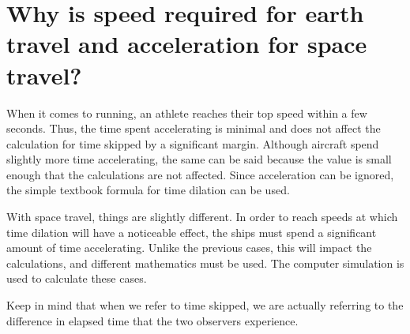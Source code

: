 \section{Why is speed required for earth travel and acceleration for space travel?}
	When it comes to running, an athlete reaches their top speed within a few seconds. Thus, the time spent accelerating is minimal and does not affect the calculation for time skipped by a significant margin. Although aircraft spend slightly more time accelerating, the same can be said because the value is small enough that the calculations are not affected. Since acceleration can be ignored, the simple textbook formula \autocite{textbook} for time dilation can be used.

	With space travel, things are slightly different. In order to reach speeds at which time dilation will have a noticeable effect, the ships must spend a significant amount of time accelerating. Unlike the previous cases, this will impact the calculations, and different mathematics must be used. The computer simulation is used to calculate these cases.

	Keep in mind that when we refer to time skipped, we are actually referring to the difference in elapsed time that the two observers experience.
